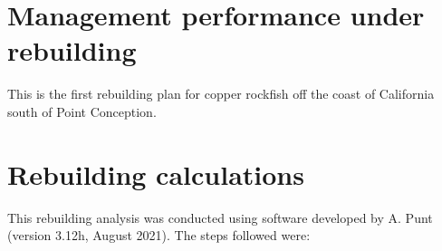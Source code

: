 \documentclass[11pt,
  english,
  a4paper,
]{article}
\begin{document}
\leavevmode\tagmcend\tagstructend\par

\clearpage


\hypertarget{management-performance-under-rebuilding}{%
\section{Management performance under rebuilding}\label{management-performance-under-rebuilding}}

\leavevmode\tagmcend\tagstructend


This is the first rebuilding plan for copper rockfish off the coast of California south of Point Conception.

\leavevmode\tagmcend\tagstructend\par


\hypertarget{rebuilding-calculations}{%
\section{Rebuilding calculations}\label{rebuilding-calculations}}

\leavevmode\tagmcend\tagstructend


This rebuilding analysis was conducted using software developed by A. Punt (version 3.12h, August 2021). The steps followed were:

\leavevmode\tagmcend\tagstructend\par
\end{document}
